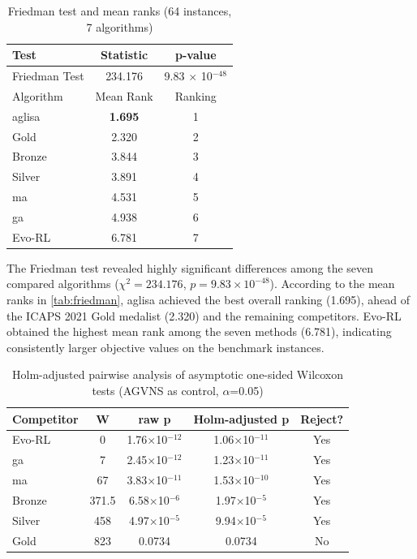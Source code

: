 \documentclass[pdflatex]{sn-jnl}
\begin{document}
\begin{table}[htp]
\centering
\caption{Friedman test and mean ranks (64 instances, 7 algorithms)}
\label{tab:friedman}
\begin{tabular*}{0.5\textwidth}{@{\extracolsep{\fill}}lcc}
\toprule
Test & Statistic & p-value \\
\midrule
Friedman Test & 234.176 & 9.83 $\times$ 10$^{-48}$ \\
\midrule
Algorithm   & Mean Rank & Ranking \\
\midrule
\gls{aglisa} & \textbf{1.695} & 1 \\
Gold        & 2.320          & 2 \\
Bronze      & 3.844          & 3 \\
Silver      & 3.891          & 4 \\
\gls{ma}    & 4.531          & 5 \\
\gls{ga}    & 4.938          & 6 \\
Evo-RL      & 6.781          & 7 \\
\bottomrule
\end{tabular*}
\end{table}

The Friedman test revealed highly significant differences among the seven
compared algorithms ($\chi^2 = 234.176$, $p = 9.83 \times 10^{-48}$).
According to the mean ranks in \autoref{tab:friedman}, \gls{aglisa} achieved
the best overall ranking (1.695), ahead of the ICAPS 2021 Gold medalist (2.320)
and the remaining competitors. Evo-RL obtained the highest mean rank among the
seven methods (6.781), indicating consistently larger objective values on the
benchmark instances.

\begin{table}[htp]
\centering
\caption[Holm-adjusted pairwise analysis]{Holm-adjusted pairwise analysis of asymptotic one-sided Wilcoxon tests (AGVNS as control, $\alpha$=0.05)}
\label{tab:holm}
\begin{tabular*}{0.7\textwidth}{@{\extracolsep{\fill}}lcccc}
\toprule
Competitor & W & raw p & Holm-adjusted p & Reject? \\
\midrule
Evo-RL    & 0   & 1.76$\times$10$^{-12}$ & 1.06$\times$10$^{-11}$ & Yes \\
\gls{ga} & 7   & 2.45$\times$10$^{-12}$ & 1.23$\times$10$^{-11}$ & Yes \\
\gls{ma} & 67  & 3.83$\times$10$^{-11}$ & 1.53$\times$10$^{-10}$ & Yes \\
Bronze    & 371.5 & 6.58$\times$10$^{-6}$  & 1.97$\times$10$^{-5}$  & Yes \\
Silver    & 458 & 4.97$\times$10$^{-5}$  & 9.94$\times$10$^{-5}$  & Yes \\
Gold      & 823 & 0.0734                 & 0.0734                 & No  \\
\bottomrule
\end{tabular*}
\end{table}
\end{document}

